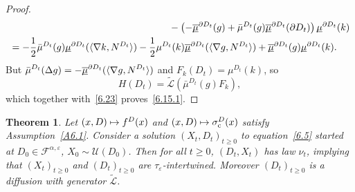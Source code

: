 \documentclass[JEP,XML,SOM,Unicode,NoFloatCountersInSection,published]{cedram}
\newcommand\mto{\mathchoice{\longmapsto}{\mapsto}{\mapsto}{\mapsto}}
\theoremstyle{plain}
\newtheorem{thm}{Theorem}[section]
\theoremstyle{definition}
\newcommand{\SF}{{\mathscr F}}
\newcommand{\SL}{{\mathscr L}}
\newcommand{\SU}{{\mathscr U}}
\newcommand{\usm}{{\underline{\smash{\mu}}}}
\newcommand{\usbm}{{\underline{\smash{\overline\mu}}}}
\let\di\displaystyle
\let\f\frac
\let\a\alpha
\let\D\Delta
\let\e\varepsilon
\let\n\nabla
\let\pa\partial
\let\wi\widetilde
\begin{document}
\begin{proof}
\begin{align*}
&\hspace*{5.8cm}-\left(-\usbm^{\partial D_t}(g)+\bar\mu^{D_t}(g)\usbm^{\partial D_t}(\partial D_t)\right)\usm^{\pa D_t}(k)\\
&=-\f12\bar\mu^{D_t}(g)\usm^{\partial D_t}(\langle \n k,N^{D_t}\rangle)-\f12 \mu^{D_t}(k)\usbm^{\pa D_t}(\langle \n g, N^{D_t}\rangle )+\usbm^{\partial D_t}(g)\usm^{\partial D_t}(k).
\end{align*}
But $\di \bar\mu^{D_t}(\D g)=-\usbm^{\partial D_t}(\langle\n g,N^{D_t}\rangle)$ and $F_k(D_t)=\mu^{D_t}(k)$, so
\begin{equation}
H(D_t)=\wi\SL(\bar \mu^{D_t}(g)F_k),
\end{equation}
which together with~\eqref{6.23} proves~\eqref{6.15.1}.
\end{proof}

\begin{thm}
\label{C6.2}
Let $(x,D)\mto f^D(x)$ and $(x,D)\mto \sigma_{\mathrm c}^D(x)$ satisfy Assumption~\ref{A6.1}. Consider a solution
$\di \left(X_{t}, D_t\right)_{t\geq 0}$ to equation~\eqref{6.5} started at $D_0\!\in\! \SF^{\a, \e}$, $X_0\!\sim\! \SU(D_0)$. Then
for all $t\ge 0$, $(D_t,X_t)$ has law $\nu_t$, implying that $(X_t)_{t\ge 0}$ and $(D_t)_{t\ge 0}$ are $\tau_\e$\nobreakdash-inter\-twined. Moreover $(D_t)_{t\geq 0}$ is a diffusion with generator $\wi \SL$.
\end{thm}
\end{document}
